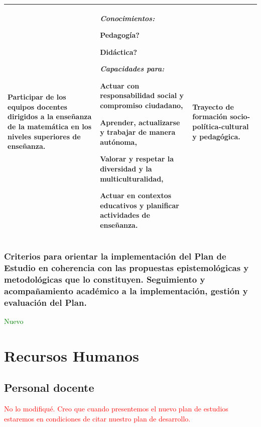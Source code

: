 \documentclass[a4paper, 12pt]{article}
\begin{document}
\begin{center}
\begin{tabularx}{1.0\textwidth}{|>{\raggedright\arraybackslash}X |
>{\raggedright\arraybackslash}X |
>{\raggedright\arraybackslash}X |
}
  Participar de los equipos docentes dirigidos a la enseñanza de la matemática en los niveles superiores de enseñanza.
  
  & 
     \emph{Conocimientos:}
   
   Pedagogía?
   
   Didáctica? 
   
   
   
   
   
   \emph{Capacidades para:}
  
   Actuar con responsabilidad social y compromiso ciudadano,
   
 Aprender, actualizarse y trabajar de manera autónoma,
 

 Valorar y respetar la diversidad y la multiculturalidad,
 
 
 Actuar en contextos educativos y planificar actividades de enseñanza.

  
  
  &  Trayecto de formación socio-política-cultural y pedagógica.\\ \hline
\end{tabularx}
\end{center}
\normalsize


\subsubsection{Criterios para orientar la implementación del Plan de Estudio en coherencia con las propuestas epistemológicas y metodológicas que lo constituyen. Seguimiento y acompañamiento académico a la implementación, gestión y evaluación del Plan.
} \textcolor{green}{Nuevo}


\section{Recursos Humanos}


\subsection{Personal docente}

\textcolor{red}{No lo modifiqué. Creo que cuando presentemos el nuevo plan de estudios estaremos en condiciones de citar nuestro plan de desarrollo.}
\end{document}
